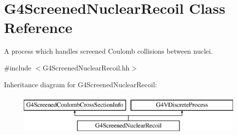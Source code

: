 \hypertarget{classG4ScreenedNuclearRecoil}{\section{G4\-Screened\-Nuclear\-Recoil Class Reference}
\label{classG4ScreenedNuclearRecoil}
}


A process which handles screened Coulomb collisions between nuclei.  




{\ttfamily \#include $<$G4\-Screened\-Nuclear\-Recoil.\-hh$>$}

Inheritance diagram for G4\-Screened\-Nuclear\-Recoil\-:\begin{figure}[H]
\begin{center}
\leavevmode
\includegraphics[height=2.000000cm]{classG4ScreenedNuclearRecoil}
\end{center}
\end{figure}
